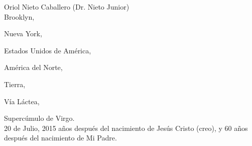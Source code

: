 \documentclass[11pt,twoside,openany]{book}
\newcommand\blankpage{%
    \null
    \thispagestyle{empty}%
    \addtocounter{page}{-1}%
    \newpage}
\begin{document}
\footnotesize
\begin{flushright}
Oriol Nieto Caballero (Dr. Nieto Junior)\\ 

Brooklyn, 

Nueva York, 

Estados Unidos de América, 

América del Norte,

Tierra, 

Vía Láctea,

Supercúmulo de Virgo.\\

20 de Julio, 2015 años después del nacimiento de Jesús Cristo (creo), y 60 años después del nacimiento de Mi Padre.
\end{flushright}

\normalsize





\afterpage{\blankpage}
\afterpage{\blankpage}
\end{document}
